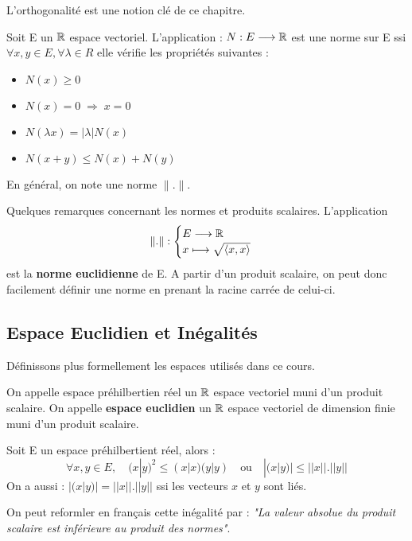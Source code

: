 L'orthogonalité est une notion clé de ce chapitre. 

\begin{definition}[Norme]
    Soit E un $\mathbb{R}$ espace vectoriel. L'application : $ N : E \longrightarrow \mathbb{R}  $ est une {norme} sur E ssi $\forall x, y \in E, \forall \lambda \in R $ elle vérifie les propriétés suivantes :
    \begin{itemize}
        \item $N(x) \geqslant 0 $
        \item $ N(x) = 0 \; \Longrightarrow \; x = 0 $
        \item $ N(\lambda x) = |\lambda | N(x) $
        \item $ N(x + y) \leqslant N(x) + N(y) $
    \end{itemize}
    En général, on note une norme $\|.\|$. 
\end{definition}

\begin{remark}
    Quelques remarques concernant les normes et produits scalaires. 
    L'application 
    \[ \|.\| : 
        \begin{cases}
            E \longrightarrow \mathbb{R} \\ 
            x \longmapsto \sqrt{\langle x, x \rangle}
        \end{cases}
    \]
    est la \textbf{norme euclidienne} de E.
    A partir d'un produit scalaire, on peut donc facilement définir une norme en prenant la racine carrée de celui-ci. 
\end{remark}

\subsection{Espace Euclidien et Inégalités}

Définissons plus formellement les espaces utilisés dans ce cours. 

\begin{definition}
    On appelle espace préhilbertien réel un $\mathbb{R}$ espace vectoriel muni d'un produit scalaire. 
    On appelle \textbf{espace euclidien} un $\mathbb{R}$ espace vectoriel de dimension finie muni d'un produit scalaire.
\end{definition}

\begin{theorem}
    Soit E un espace préhilbertient réel, alors : \[ \forall x, y \in E, \quad  \boxed { (x|y)^2 \leqslant(x|x)(y|y) \quad \text{ou} \quad |(x|y)| \leqslant||x||.||y|| }  \]
    On a aussi : $ |(x|y)| = ||x||.||y|| $ ssi les vecteurs $x$ et $y$ sont liés.

    \vspace{0.3cm}

    On peut reformler en français cette inégalité par : \emph{"La valeur absolue du produit scalaire est inférieure au produit des normes"}. 
\end{theorem}

